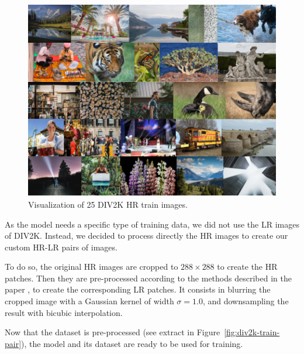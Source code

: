 \documentclass{article}
\begin{document}
{    \begin{figure}[ht]
        \centering
        \includegraphics[width=\textwidth]{images/DIV2K_HR.png}
        \caption{Visualization of 25 DIV2K HR train images.}
        \label{fig:div2k-train-og}
    \end{figure}

    \bigskip

    As the model needs a specific type of training data, we did not use the LR images of DIV2K. Instead, we decided to process directly the HR images to create our custom HR-LR pairs of images.

    To do so, the original HR images are cropped to $288 \times 288$ to create the HR patches. Then they are pre-processed according to the methods described in the paper \citep{sr}, to create the corresponding LR patches. It consists in blurring the cropped image with a Gaussian kernel of width $\sigma = 1.0$, and downsampling the result with bicubic interpolation.

    Now that the dataset is pre-processed (see extract in Figure~\ref{fig:div2k-train-pair}), the model and its dataset are ready to be used for training.

}
\end{document}
